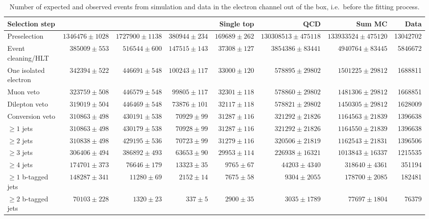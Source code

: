 \begin{table}
  \centering
   \caption[Number of expected and observed events from simulation and data in the electron channel]{Number of expected
   and observed events from simulation and data in the electron channel out of the box, i.e.\ before the fitting
   process.}
    \label{tab:event_yields_ejets}
    \resizebox{\columnwidth}{!} {
    \begin{tabular}{lrrrrrrr}
    \toprule
	\textbf{Selection step} & \textbf{\ttjets} & \textbf{\WpJets} & \textbf{\ZpJets} & \textbf{Single top} & \textbf{QCD} & \textbf{Sum MC} & \textbf{Data} \\
	\midrule
	Preselection  &  $1346476 \pm 1028$ &  $1727900 \pm 1138$ &  $380944 \pm 234$ &  $169689 \pm 262$ &  $130308513 \pm 475118$ &  $133933524 \pm 475120$ &  13042702 \\ 
	Event cleaning/HLT  &  $385009 \pm 553$ &  $516544 \pm 600$ &  $147515 \pm 143$ &  $37308 \pm 127$ &  $3854386 \pm 83441$ &  $4940764 \pm 83445$ &  5846672 \\ 
	One isolated electron  &  $342394 \pm 522$ &  $446691 \pm 548$ &  $100243 \pm 117$ &  $33000 \pm 120$ &  $578895 \pm 29802$ &  $1501225 \pm 29812$ &  1688811 \\ 
	Muon veto  &  $323759 \pm 508$ &  $446579 \pm 548$ &  $99805 \pm 117$ &  $32301 \pm 118$ &  $578860 \pm 29802$ &  $1481306 \pm 29812$ &  1668851 \\ 
	Dilepton veto  &  $319019 \pm 504$ &  $446469 \pm 548$ &  $73876 \pm 101$ &  $32117 \pm 118$ &  $578821 \pm 29802$ &  $1450305 \pm 29812$ &  1628009 \\ 
	Conversion veto  &  $310863 \pm 498$ &  $430191 \pm 538$ &  $70929 \pm 99$ &  $31287 \pm 116$ &  $321292 \pm 21826$ &  $1164563 \pm 21839$ &  1396638 \\ 
	$\geq 1$ jets  &  $310863 \pm 498$ &  $430179 \pm 538$ &  $70928 \pm 99$ &  $31287 \pm 116$ &  $321292 \pm 21826$ &  $1164550 \pm 21839$ &  1396638 \\ 
	$\geq 2$ jets  &  $310838 \pm 498$ &  $429195 \pm 536$ &  $70723 \pm 99$ &  $31279 \pm 116$ &  $320506 \pm 21819$ &  $1162543 \pm 21831$ &  1396506 \\ 
	$\geq 3$ jets  &  $306406 \pm 494$ &  $386892 \pm 493$ &  $63653 \pm 90$ &  $29953 \pm 114$ &  $226938 \pm 16321$ &  $1013843 \pm 16337$ &  1215535 \\ 
	$\geq 4$ jets  &  $174701 \pm 373$ &  $76646 \pm 179$ &  $13323 \pm 35$ &  $9765 \pm 67$ &  $44203 \pm 4340$ &  $318640 \pm 4361$ &  351194 \\ 
	$\geq 1$ b-tagged jets  &  $148287 \pm 341$ &  $11280 \pm 69$ &  $2152 \pm 14$ &  $7675 \pm 58$ &  $9304 \pm 2055$ &  $178700 \pm 2085$ &  182481 \\ 
	$\geq 2$ b-tagged jets  &  $70103 \pm 228$ &  $1320 \pm 23$ &  $337 \pm 5$ &  $2900 \pm 35$ &  $3035 \pm 1789$ &  $77697 \pm 1804$ &  76379 \\ 
	\bottomrule
	\end{tabular}
	}
\end{table}

